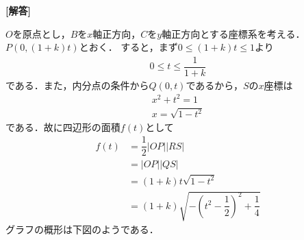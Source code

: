 \documentclass[../../main.tex]{subfiles}
\begin{document}
\begin{oframed}
  
\end{oframed}

{\bf [解答]}

$O$を原点とし，$B$を$x$軸正方向，$C$を$y$軸正方向とする座標系を考える．$P(0,(1+k)t)$とおく．
すると，まず$0\le(1+k)t\le1$より
\begin{align}
  0\le t\le\dfrac{1}{1+k}\label{eq:1}
\end{align}
である．また，内分点の条件から$Q(0,t)$であるから，$S$の$x$座標は
\begin{align}
  x^2+t^2=1 \\
  x=\sqrt{1-t^2}
\end{align}
である．故に四辺形の面積$f(t)$として
\begin{align}
  f(t)&=\dfrac{1}{2}|OP||RS| \\
  &=|OP||QS| \\
  &=(1+k)t\sqrt{1-t^2} \\
  &=(1+k)\sqrt{-\left(t^2-\dfrac{1}{2}\right)^2+\dfrac{1}{4}}
\end{align}
グラフの概形は下図のようである．
\end{document}

